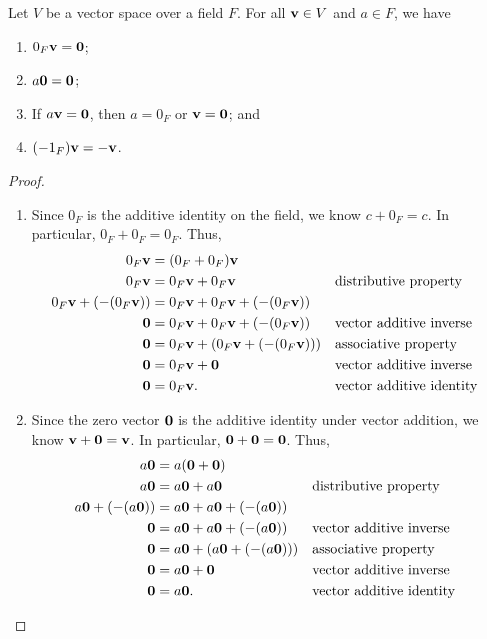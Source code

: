 \begin{thm}
Let $ V $ be a vector space over a field $ F $. For all $ \vect{v}\in V $ and $ a\in F $, we have
\begin{enumerate}
    \item\label{thm:vectspace1} $ 0_F\vect{v}=\vect{0} $;
    \item\label{thm:vectspace2} $ a\vect{0}=\vect{0} $;
    \item If $ a\vect{v}=\vect{0} $, then $ a=0_F $ or $ \vect{v}=\vect{0} $; and
    \item\label{thm:vectspace4} $ (-1_F)\vect{v}=-\vect{v} $.
\end{enumerate}
\end{thm}
\begin{proof}~
\begin{enumerate}
    \item Since $ 0_F $ is the additive identity on the field, we know $ c+0_F=c $. In particular, $ 0_F+0_F=0_F $. Thus,
    \begin{align*}
        0_F\vect{v} &= (0_F+0_F)\vect{v} \\
        0_F\vect{v} &= 0_F\vect{v}+0_F\vect{v} && \text{distributive property} \\
        0_F\vect{v}+(-(0_F\vect{v})) &= 0_F\vect{v}+0_F\vect{v}+(-(0_F\vect{v})) \\
        \vect{0} &= 0_F\vect{v}+0_F\vect{v}+(-(0_F\vect{v})) && \text{vector additive inverse} \\
        \vect{0} &= 0_F\vect{v}+(0_F\vect{v}+(-(0_F\vect{v}))) && \text{associative property} \\
        \vect{0} &= 0_F\vect{v}+\vect{0} && \text{vector additive inverse} \\
        \vect{0} &= 0_F\vect{v}. && \text{vector additive identity}
    \end{align*}

    \item Since the zero vector $ \vect{0} $ is the additive identity under vector addition, we know $ \vect{v}+\vect{0}=\vect{v} $. In particular, $ \vect{0}+\vect{0}=\vect{0} $. Thus,
    \begin{align*}
        a\vect{0} &= a(\vect{0}+\vect{0}) \\
        a\vect{0} &= a\vect{0}+a\vect{0} && \text{distributive property} \\
        a\vect{0}+(-(a\vect{0})) &= a\vect{0}+a\vect{0}+(-(a\vect{0})) \\
        \vect{0} &= a\vect{0}+a\vect{0}+(-(a\vect{0})) && \text{vector additive inverse} \\
        \vect{0} &= a\vect{0}+(a\vect{0}+(-(a\vect{0}))) && \text{associative property} \\
        \vect{0} &= a\vect{0}+\vect{0} && \text{vector additive inverse} \\
        \vect{0} &= a\vect{0}. && \text{vector additive identity}
    \end{align*}


\end{enumerate}
\end{proof}
